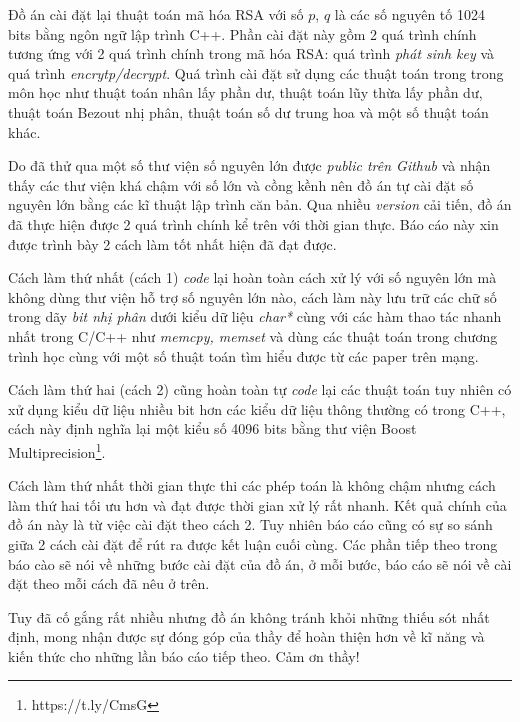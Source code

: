 Đồ án cài đặt lại thuật toán mã hóa RSA với số $p$, $q$ là các số nguyên tố 1024 bits bằng ngôn ngữ lập trình C++. 
Phần cài đặt này gồm 2 quá trình chính tương ứng với 2 quá trình chính trong mã hóa RSA: 
quá trình \textit{phát sinh key} và quá trình \textit{encrytp/decrypt}.
Quá trình cài đặt sử dụng các thuật toán trong trong môn học như thuật toán nhân lấy phần dư, 
thuật toán lũy thừa lấy phần dư, thuật toán Bezout nhị phân, thuật toán số dư trung hoa và một số thuật toán khác. 

Do đã thử qua một số thư viện số nguyên lớn được \textit{public trên Github} và nhận thấy các thư viện khá chậm với số lớn và cồng kềnh nên đồ án tự cài đặt số nguyên lớn bằng các kĩ thuật lập trình căn bản.
Qua nhiều \textit{version} cải tiến, đồ án đã thực hiện được 2 quá trình chính kể trên với thời gian thực.
Báo cáo này xin được trình bày 2 cách làm tốt nhất hiện đã đạt được. 

Cách làm thứ nhất (cách 1) \textit{code} lại hoàn toàn cách xử lý với số nguyên lớn mà không dùng thư viện hỗ trợ số nguyên lớn nào, 
cách làm này lưu trữ các chữ số trong dãy \textit{bit nhị phân} dưới kiểu dữ liệu \textit{char*} cùng với các hàm thao tác nhanh nhất trong C/C++ như \textit{memcpy, memset}
và dùng các thuật toán trong chương trình học cùng với một số thuật toán tìm hiểu được từ các paper trên mạng.

Cách làm thứ hai (cách 2) cũng hoàn toàn tự \textit{code} lại các thuật toán tuy nhiên có xử dụng kiểu dữ liệu nhiều bit hơn các kiểu dữ liệu thông thường có trong C++, 
cách này định nghĩa lại một kiểu số 4096 bits bằng thư viện Boost Multiprecision\footnote{https://t.ly/CmsG}.

Cách làm thứ nhất thời gian thực thi các phép toán là không chậm nhưng cách làm thứ hai tối ưu hơn và đạt được thời gian xử lý rất nhanh. 
Kết quả chính của đồ án này là từ việc cài đặt theo cách 2. Tuy nhiên báo cáo cũng có sự so sánh giữa 2 cách cài đặt để rút ra được kết luận cuối cùng. Các phần tiếp theo trong 
báo cào sẽ nói về những bước cài đặt của đồ án, ở mỗi bước, báo cáo sẽ nói về cài đặt theo mỗi cách đã nêu ở trên.

Tuy đã cố gắng rất nhiều nhưng đồ án không tránh khỏi những thiếu sót nhất định, mong nhận được sự đóng góp của thầy để hoàn thiện hơn về kĩ năng và kiến thức 
cho những lần báo cáo tiếp theo. Cảm ơn thầy!